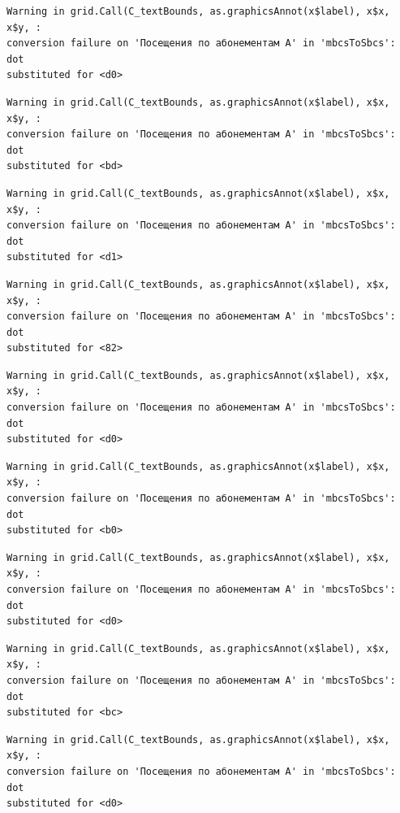 \documentclass[
  letterpaper,
  DIV=11,
  numbers=noendperiod]{scrartcl}
\begin{document}
\begin{verbatim}
Warning in grid.Call(C_textBounds, as.graphicsAnnot(x$label), x$x, x$y, :
conversion failure on 'Посещения по абонементам А' in 'mbcsToSbcs': dot
substituted for <d0>
\end{verbatim}

\begin{verbatim}
Warning in grid.Call(C_textBounds, as.graphicsAnnot(x$label), x$x, x$y, :
conversion failure on 'Посещения по абонементам А' in 'mbcsToSbcs': dot
substituted for <bd>
\end{verbatim}

\begin{verbatim}
Warning in grid.Call(C_textBounds, as.graphicsAnnot(x$label), x$x, x$y, :
conversion failure on 'Посещения по абонементам А' in 'mbcsToSbcs': dot
substituted for <d1>
\end{verbatim}

\begin{verbatim}
Warning in grid.Call(C_textBounds, as.graphicsAnnot(x$label), x$x, x$y, :
conversion failure on 'Посещения по абонементам А' in 'mbcsToSbcs': dot
substituted for <82>
\end{verbatim}

\begin{verbatim}
Warning in grid.Call(C_textBounds, as.graphicsAnnot(x$label), x$x, x$y, :
conversion failure on 'Посещения по абонементам А' in 'mbcsToSbcs': dot
substituted for <d0>
\end{verbatim}

\begin{verbatim}
Warning in grid.Call(C_textBounds, as.graphicsAnnot(x$label), x$x, x$y, :
conversion failure on 'Посещения по абонементам А' in 'mbcsToSbcs': dot
substituted for <b0>
\end{verbatim}

\begin{verbatim}
Warning in grid.Call(C_textBounds, as.graphicsAnnot(x$label), x$x, x$y, :
conversion failure on 'Посещения по абонементам А' in 'mbcsToSbcs': dot
substituted for <d0>
\end{verbatim}

\begin{verbatim}
Warning in grid.Call(C_textBounds, as.graphicsAnnot(x$label), x$x, x$y, :
conversion failure on 'Посещения по абонементам А' in 'mbcsToSbcs': dot
substituted for <bc>
\end{verbatim}

\begin{verbatim}
Warning in grid.Call(C_textBounds, as.graphicsAnnot(x$label), x$x, x$y, :
conversion failure on 'Посещения по абонементам А' in 'mbcsToSbcs': dot
substituted for <d0>
\end{verbatim}
\end{document}

